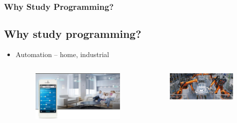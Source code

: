 \documentclass{beamer}
\begin{document}
\begin{frame}
    \frametitle{Why Study Programming?}
    \subsection{Why study programming?} %
    \label{subsec:why_study_programming}
    \begin{itemize}
        \item Automation -- home, industrial
        \begin{columns}
            \begin{figure}
                \centering
                \includegraphics[scale=0.33]{home_automation}
            \end{figure}
            \begin{figure}
                \centering
                \includegraphics[scale=0.33]{industrial_automation}
            \end{figure}
        \end{columns}
    \end{itemize}
\end{frame}
\end{document}
